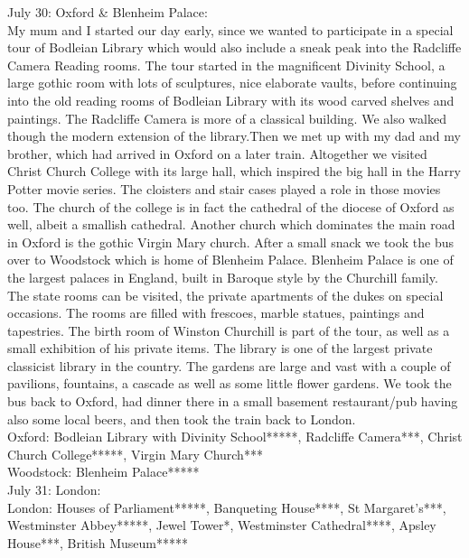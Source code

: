 July 30: Oxford \& Blenheim Palace:\\
My mum and I started our day early, since we wanted to participate in a special tour of Bodleian Library which would also include a sneak peak into the Radcliffe Camera Reading rooms. The tour started in the magnificent Divinity School, a large gothic room with lots of sculptures, nice elaborate vaults, before continuing into the old reading rooms of Bodleian Library with its wood carved shelves and paintings. The Radcliffe Camera is more of a classical building. We also walked though the modern extension of the library.Then we met up with my dad and my brother, which had arrived in Oxford on a later train. Altogether we visited Christ Church College with its large hall, which inspired the big hall in the Harry Potter movie series. The cloisters and stair cases played a role in those movies too. The church of the college is in fact the cathedral of the diocese of Oxford as well, albeit a smallish cathedral. Another church which dominates the main road in Oxford is the gothic Virgin Mary church. After a small snack we took the bus over to Woodstock which is home of Blenheim Palace. Blenheim Palace is one of the largest palaces in England, built in Baroque style by the Churchill family. The state rooms can be visited, the private apartments of the dukes on special occasions. The rooms are filled with frescoes, marble statues, paintings and tapestries. The birth room of Winston Churchill is part of the tour, as well as a small exhibition of his private items. The library is one of the largest private classicist library in the country. The gardens are large and vast with a couple of pavilions, fountains, a cascade as well as some little flower gardens. We took the bus back to Oxford, had dinner there in a small basement restaurant/pub having also some local beers, and then took the train back to London.\\
 
Oxford: Bodleian Library with Divinity School*****, Radcliffe Camera***, Christ Church College*****, Virgin Mary Church***\\
Woodstock: Blenheim Palace*****\\

July 31: London:\\
London: Houses of Parliament*****, Banqueting House****, St Margaret's***, Westminster Abbey*****, Jewel Tower*, Westminster Cathedral****, Apsley House***, British Museum*****\\


